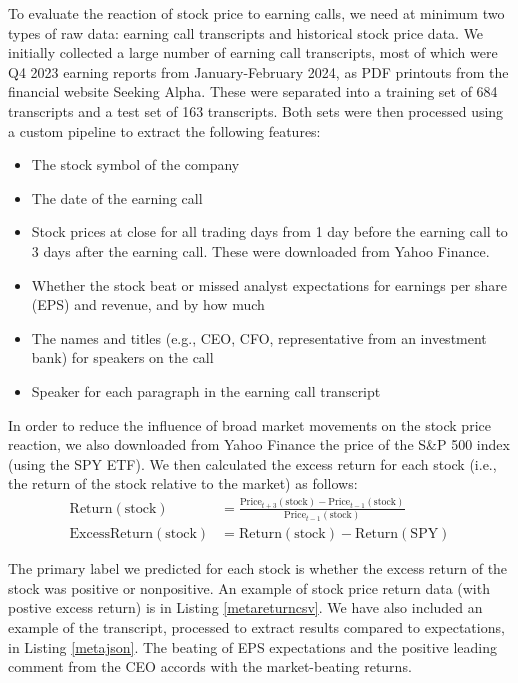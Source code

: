 \documentclass{article}
\begin{document}
To evaluate the reaction of stock price to earning calls, we need at minimum two types of raw data: earning call transcripts and historical stock price data.
We initially collected a large number of earning call transcripts, most of which were Q4 2023 earning reports from January-February 2024, as PDF printouts from the financial website Seeking Alpha.
These were separated into a training set of 684 transcripts and a test set of 163 transcripts.
Both sets were then processed using a custom pipeline to extract the following features:
\begin{itemize}
  \item The stock symbol of the company
  \item The date of the earning call
  \item Stock prices at close for all trading days from 1 day before the earning call to 3 days after the earning call. These were downloaded from Yahoo Finance.
  \item Whether the stock beat or missed analyst expectations for earnings per share (EPS) and revenue, and by how much
  \item The names and titles (e.g., CEO, CFO, representative from an investment bank) for speakers on the call
  \item Speaker for each paragraph in the earning call transcript
\end{itemize}

In order to reduce the influence of broad market movements on the stock price reaction, we also downloaded from Yahoo Finance the price of the S\&P 500 index (using the SPY ETF).
We then calculated the excess return for each stock (i.e., the return of the stock relative to the market) as follows:
\begin{align*}
  \text{Return}(\text{stock}) &= \frac{\text{Price}_{t+3}(\text{stock})-\text{Price}_{t-1}(\text{stock})}{\text{Price}_{t-1}(\text{stock})} \\
  \text{ExcessReturn}(\text{stock}) &= \text{Return}(\text{stock}) - \text{Return}(\text{SPY})
\end{align*}

The primary label we predicted for each stock is whether the excess return of the stock was positive or nonpositive.
An example of stock price return data (with postive excess return) is in Listing \ref{metareturncsv}.
We have also included an example of the transcript, processed to extract results compared to expectations, in Listing \ref{metajson}.
The beating of EPS expectations and the positive leading comment from the CEO accords with the market-beating returns.
\end{document}
